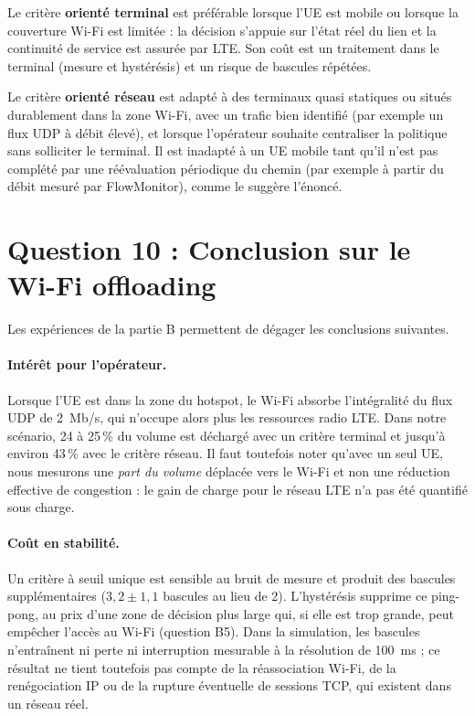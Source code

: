 Le critère \textbf{orienté terminal} est préférable lorsque l'UE est mobile ou
lorsque la couverture Wi-Fi est limitée : la décision s'appuie sur l'état
réel du lien et la continuité de service est assurée par LTE. Son coût est un
traitement dans le terminal (mesure et hystérésis) et un risque de bascules
répétées.

Le critère \textbf{orienté réseau} est adapté à des terminaux quasi
statiques ou situés durablement dans la zone Wi-Fi, avec un trafic bien
identifié (par exemple un flux UDP à débit élevé), et lorsque l'opérateur
souhaite centraliser la politique sans solliciter le terminal. Il est
inadapté à un UE mobile tant qu'il n'est pas complété par une réévaluation
périodique du chemin (par exemple à partir du débit mesuré par FlowMonitor),
comme le suggère l'énoncé.

\section{Question 10 : Conclusion sur le Wi-Fi offloading}

Les expériences de la partie B permettent de dégager les conclusions suivantes.

\paragraph{Intérêt pour l'opérateur.}
Lorsque l'UE est dans la zone du hotspot, le Wi-Fi absorbe l'intégralité du
flux UDP de 2~Mb/s, qui n'occupe alors plus les ressources radio LTE. Dans
notre scénario, 24 à 25\,\% du volume est déchargé avec un critère terminal
et jusqu'à environ 43\,\% avec le critère réseau. Il faut toutefois noter
qu'avec un seul UE, nous mesurons une \emph{part du volume} déplacée vers le
Wi-Fi et non une réduction effective de congestion : le gain de charge pour le
réseau LTE n'a pas été quantifié sous charge.

\paragraph{Coût en stabilité.}
Un critère à seuil unique est sensible au bruit de mesure et produit des
bascules supplémentaires ($3{,}2 \pm 1{,}1$ bascules au lieu de 2). L'hystérésis
supprime ce ping-pong, au prix d'une zone de décision plus large qui, si elle
est trop grande, peut empêcher l'accès au Wi-Fi (question B5). Dans la
simulation, les bascules n'entraînent ni perte ni interruption mesurable à la
résolution de 100~ms ; ce résultat ne tient toutefois pas compte de la
réassociation Wi-Fi, de la renégociation IP ou de la rupture éventuelle de
sessions TCP, qui existent dans un réseau réel.

